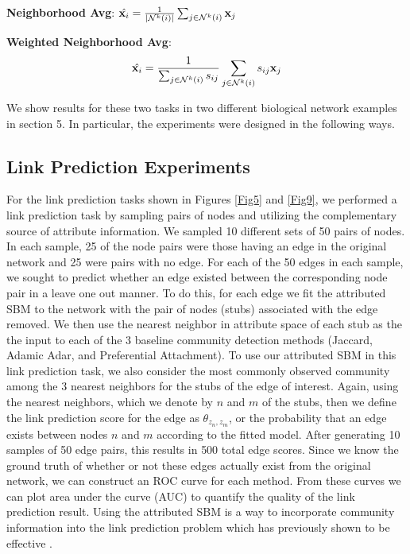 {\bf Neighborhood Avg}: $\hat{{\bf x}_{i}}= \frac{1}{|\mathcal{N}^{k}(i)|}\sum_{j \in \mathcal{N}^{k}(i)} {\bf x}_{j}$

{\bf Weighted Neighborhood Avg}: \[\hat{{\bf x}_{i}}=\frac{1}{\sum_{j \in \mathcal{N}^{k}(i)}s_{ij}}\sum_{j \in \mathcal{N}^{k}(i)}s_{ij}{\bf x}_{j}\]

We show results for these two tasks in two different biological network examples in section 5. In particular, the experiments were designed in the following ways.

\subsection{Link Prediction Experiments}
For the link prediction tasks shown in Figures \ref{Fig5} and \ref{Fig9}, we performed a link prediction task by sampling pairs of nodes and utilizing the complementary source of attribute information. We sampled 10 different sets of 50 pairs of nodes. In each sample, 25 of the node pairs were those having an edge in the original network and 25 were pairs with no edge. For each of the 50 edges in each sample, we sought to predict whether an edge existed between the corresponding node pair in a leave one out manner. To do this, for each edge we fit the attributed SBM to the network with the pair of nodes (stubs) associated with the edge removed. We then use the nearest neighbor in attribute space of each stub as the the input to each of the 3 baseline community detection methods (Jaccard, Adamic Adar, and Preferential Attachment). To use our attributed SBM in this link prediction task, we also consider the most commonly observed community among the 3 nearest neighbors for the stubs of the edge of interest. Again, using the nearest neighbors, which we denote by $n$ and $m$ of the stubs, then we define the link prediction score for the edge as $\theta_{z_{n},z_{m}}$, or the probability that an edge exists between nodes $n$ and $m$ according to the fitted model. After generating 10 samples of 50 edge pairs, this results in 500 total edge scores. Since we know the ground truth of whether or not these edges actually exist from the original network, we can construct an ROC curve for each method. From these curves we can plot area under the curve (AUC) to quantify the quality of the link prediction result. Using the attributed SBM is a way to incorporate community information into the link prediction problem which has previously shown to be effective \cite{linkComm}.

